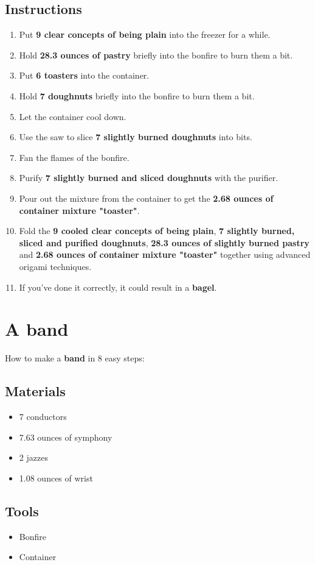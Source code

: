 \documentclass{article}
\begin{document}
\subsection{Instructions}\begin{enumerate}
\item 
Put \textbf{9 clear concepts of being plain} into the freezer for a while.
\item 
Hold \textbf{28.3 ounces of pastry} briefly into the bonfire to burn them a bit.
\item 
Put \textbf{6 toasters} into the container.
\item 
Hold \textbf{7 doughnuts} briefly into the bonfire to burn them a bit.
\item 
Let the container cool down.
\item 
Use the saw to slice \textbf{7 slightly burned doughnuts} into bits.
\item 
Fan the flames of the bonfire.
\item 
Purify \textbf{7 slightly burned and sliced doughnuts} with the purifier.
\item 
Pour out the mixture from the container to get the \textbf{2.68 ounces of container mixture "toaster"}.
\item 
Fold the \textbf{9 cooled clear concepts of being plain}, \textbf{7 slightly burned, sliced and purified doughnuts}, \textbf{28.3 ounces of slightly burned pastry} and \textbf{2.68 ounces of container mixture "toaster"} together using advanced origami techniques.
\item 
If you've done it correctly, it could result in a \textbf{bagel}.
\end{enumerate}
\newpage
\section{A band}How to make a \textbf{band} in 8 easy steps:

\subsection{Materials}\begin{itemize}
\item 
7 conductors
\item 
7.63 ounces of symphony
\item 
2 jazzes
\item 
1.08 ounces of wrist
\end{itemize}
\subsection{Tools}\begin{itemize}
\item 
Bonfire
\item 
Container
\end{itemize}
\end{document}
